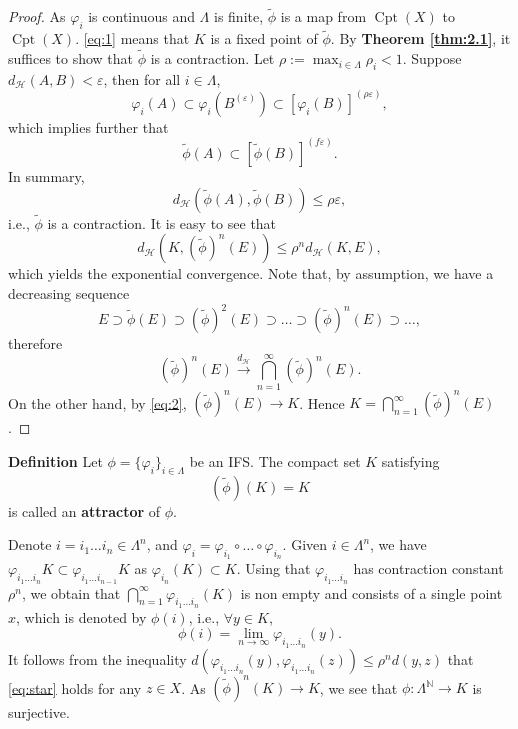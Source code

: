 \begin{proof}
As $\varphi _{i}$ is continuous and $\Lambda$ is finite, $\tilde{\phi }$ is a map from $\operatorname{Cpt}(X)$ to $\operatorname{Cpt}(X)$. \eqref{eq:1} means that $K$ is a fixed point of $\tilde{\phi}$. By \textbf{Theorem \ref{thm:2.1}}, it suffices to show that $\tilde{\phi}$ is a contraction. Let $\rho:= \max_{i \in \Lambda}\rho _{i}<1$. Suppose $d_{\mathcal{H}}(A,B)<\varepsilon$, then for all $i \in \Lambda$, 
\[
\varphi _{i}(A)\subset \varphi _{i}(B^{(\varepsilon)})\subset[\varphi _{i}(B)]^{(\rho \varepsilon)},
\]
which implies further that
\[
\tilde{\phi}(A)\subset[\tilde{\phi}(B)]^{(f\varepsilon)}.
\]
In summary,
\[
d_{\mathcal{H}}(\tilde{\phi}(A),\tilde{\phi}(B))\leq \rho \varepsilon,
\]
i.e., $\tilde{\phi}$ is a contraction.
It is easy to see that
\begin{equation}\label{eq:2}
d_{\mathcal{H}}(K,(\tilde{\phi})^{n}(E))\leq \rho ^{n}d_{\mathcal{H}}(K,E),
\end{equation}
which yields the exponential convergence.
Note that, by assumption, we have a decreasing sequence
\[
E\supset \tilde{\phi}(E)\supset  (\tilde{\phi})^{2}(E)\supset \dots \supset (\tilde{\phi})^{n}(E)\supset \dots,
\]
therefore
\[
(\tilde{\phi})^{n}(E)\xrightarrow{d_{\mathcal{H}}}\bigcap _{n=1}^{\infty}(\tilde{\phi})^{n}(E).
\]
On the other hand, by \eqref{eq:2}, $(\tilde{\phi})^{n}(E)\to K$. Hence $\displaystyle K=\bigcap _{n=1}^{\infty}(\tilde{\phi})^{n}(E)$.
\end{proof}

\textbf{Definition} Let $\phi=\{ \varphi _{i} \}_{i \in \Lambda}$ be an IFS. The compact set $K$ satisfying
\[
(\tilde{\phi})(K)=K
\]
is called an \textbf{attractor} of $\phi$.

Denote $i=i_{1}\dots i_{n}\in \Lambda ^{n}$, and $\varphi _{i}=\varphi _{i_{1}}\circ\dots\circ \varphi _{i_{n}}$. Given $i \in \Lambda ^{n}$, we have $\varphi _{i_{1}\dots i_{n}}K\subset \varphi _{i_{1}\dots i_{n-1}}K$ as $\varphi _{i_{n}}(K)\subset K$. Using that $\varphi _{i_{1}\dots i_{n}}$ has contraction constant $\rho ^{n}$, we obtain that $\displaystyle \bigcap _{n=1}^{\infty}\varphi _{i_{1}\dots i_{n}}(K)$ is non empty and consists of a single point $x$, which is denoted by $\phi(i)$, i.e., $\forall y \in K$,
\begin{equation}\label{eq:star}
\phi(i)=\lim_{ n \to \infty } \varphi _{i_{1}\dots i_{n}}(y).
\end{equation}
It follows from the inequality $d(\varphi _{i_{1}\dots i_{n}}(y),\varphi _{i_{1}\dots i_{n}}(z))\leq \rho ^{n}d(y,z)$ that \eqref{eq:star} holds for any $z \in X$.
As $(\tilde{\phi})^{n}(K)\to K$, we see that $\phi:\Lambda ^{\mathbb{N}}\to K$ is surjective.

